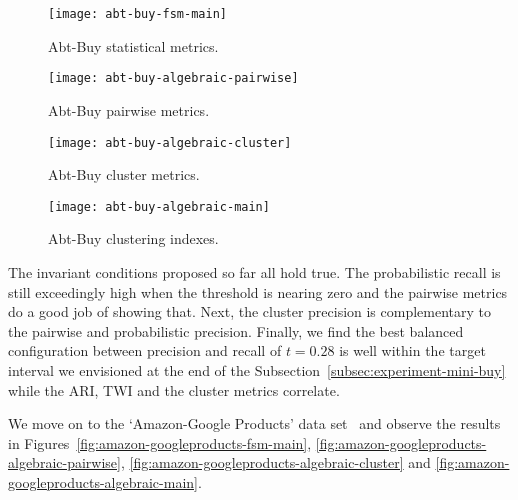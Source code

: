 \begin{figure*}[htbp]
    \begin{minipage}{0.24\textwidth}
        \centering
        \texttt{[image: abt-buy-fsm-main]}
        \caption{Abt-Buy statistical metrics.}
        \label{fig:abt-buy-fsm-main}
    \end{minipage}
    \begin{minipage}{0.24\textwidth}
        \centering
        \texttt{[image: abt-buy-algebraic-pairwise]}
        \caption{Abt-Buy pairwise metrics.}
        \label{fig:abt-buy-algebraic-pairwise}
    \end{minipage}
    \begin{minipage}{0.24\textwidth}
        \centering
        \texttt{[image: abt-buy-algebraic-cluster]}
        \caption{Abt-Buy cluster metrics.}
        \label{fig:abt-buy-algebraic-cluster}
    \end{minipage}
    \begin{minipage}{0.24\textwidth}
        \centering
        \texttt{[image: abt-buy-algebraic-main]}
        \caption{Abt-Buy clustering indexes.}
        \label{fig:abt-buy-algebraic-main}
    \end{minipage}
\end{figure*}\label{abt-buy}

The invariant conditions proposed so far all hold true.
The probabilistic recall is still exceedingly high when the threshold is nearing zero and the
pairwise metrics do a good job of showing that.
Next, the cluster precision is complementary to the pairwise and probabilistic
precision.
Finally, we find the best balanced configuration between precision and recall of
$t=0.28$ is well within the target interval we envisioned at the end of the
Subsection~\ref{subsec:experiment-mini-buy} while the ARI, TWI and the cluster metrics correlate.

We move on to the `Amazon-Google Products' data set~\cite{vldb2010} and observe
the results in Figures~\ref{fig:amazon-googleproducts-fsm-main},
\ref{fig:amazon-googleproducts-algebraic-pairwise},
\ref{fig:amazon-googleproducts-algebraic-cluster} and
\ref{fig:amazon-googleproducts-algebraic-main}.

